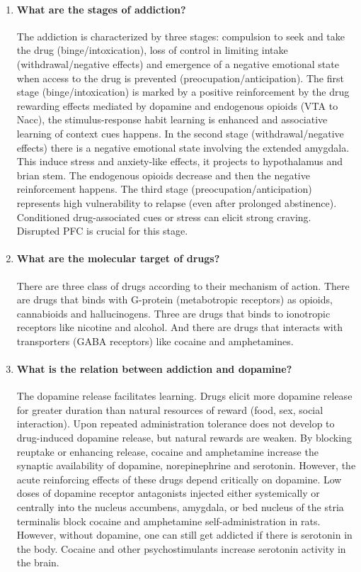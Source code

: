 \documentclass[12pt,article,oneside,a4paper]{memoir}
\begin{document}
\begin{enumerate}
\item \paragraph{What are the stages of addiction?}
The addiction is characterized by three stages: compulsion to seek and take the
drug (binge/intoxication), loss of control in limiting intake
(withdrawal/negative effects) and emergence of a negative emotional state when
access to the drug is prevented (preocupation/anticipation).
The first stage (binge/intoxication) is marked by a positive reinforcement by
the drug rewarding effects mediated by dopamine and endogenous opioids (VTA to
Nacc), the stimulus-response habit learning is enhanced and associative
learning of context cues happens.
In the second stage (withdrawal/negative effects) there is a negative emotional
state involving the extended amygdala. This induce stress and anxiety-like
effects, it projects to hypothalamus and brian stem. The endogenous opioids
decrease and then the negative reinforcement happens.
The third stage (preocupation/anticipation) represents high vulnerability to
relapse (even after prolonged abstinence). Conditioned drug-associated cues or
stress can elicit strong craving. Disrupted PFC is crucial for this stage.

\item \paragraph{What are the molecular target of drugs?}
There are three class of drugs according to their mechanism of action.
There are drugs that binds with G-protein (metabotropic receptors) as opioids,
cannabioids and hallucinogens. Three are drugs that binds to ionotropic
receptors like nicotine and alcohol. And there are drugs that interacts with
transporters (GABA receptors) like cocaine and amphetamines.

\item \paragraph{What is the relation between addiction and dopamine?}
The dopamine release facilitates learning. Drugs elicit more dopamine release
for greater duration than natural resources of reward (food, sex, social
interaction). Upon repeated administration tolerance does not develop to
drug-induced dopamine release, but natural rewards are weaken.
By blocking reuptake or enhancing release, cocaine and amphetamine increase the
synaptic availability of dopamine, norepinephrine and serotonin. However, the
acute reinforcing effects of these drugs depend critically on dopamine. Low
doses of dopamine receptor antagonists injected either systemically or
centrally into the nucleus accumbens, amygdala, or bed nucleus of the stria
terminalis block cocaine and amphetamine self-administration in rats.
However, without dopamine, one can still get addicted if there is serotonin in
the body. Cocaine and other psychostimulants increase serotonin activity in the
brain.

\end{enumerate} 
\end{document}
